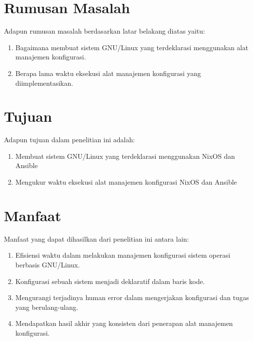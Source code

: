 \documentclass[10pt,]{report}
\begin{document}
\section{Rumusan Masalah}
\vspace{-3mm}
\begin{adjustwidth}{0.70cm}{}
	Adapun rumusan masalah berdasarkan latar belakang diatas yaitu:
	\begin{enumerate}[leftmargin=0.45cm]
		\item Bagaimana membuat sistem GNU/Linux yang terdeklarasi menggunakan alat
		      manajemen konfigurasi.
		\item Berapa lama waktu eksekusi alat manajemen konfigurasi yang diimplementasikan.
	\end{enumerate}
\end{adjustwidth}
\section{Tujuan}
\vspace{-3mm}
\begin{adjustwidth}{0.70cm}{}
	Adapun tujuan dalam penelitian ini adalah:
	\begin{enumerate}[leftmargin=0.45cm]
		\item Membuat sistem GNU/Linux yang terdeklarasi menggunakan NixOS dan
		      Ansible
		\item Mengukur waktu eksekusi alat manajemen konfigurasi NixOS dan Ansible
	\end{enumerate}
\end{adjustwidth}
\vspace{3mm}
\section{Manfaat}
\vspace{-3mm}
\begin{adjustwidth}{0.70cm}{}
	Manfaat yang dapat dihasilkan dari penelitian ini antara lain:
	\begin{enumerate}[leftmargin=0.45cm]
		\item Efisiensi waktu dalam melakukan manajemen konfigurasi sistem operasi berbasis GNU/Linux.
		\item Konfigurasi sebuah sistem menjadi deklaratif dalam baris kode.
		\item Mengurangi terjadinya human error dalam mengerjakan konfigurasi dan tugas yang berulang-ulang.
		\item Mendapatkan hasil akhir yang konsisten dari penerapan alat manajemen konfigurasi.
	\end{enumerate}
\end{adjustwidth}
\vspace{3mm}
\end{document}
